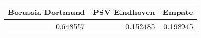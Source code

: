 \begin{tabular}{rrr}
\hline
   Borussia Dortmund &   PSV Eindhoven &   Empate \\
\hline
            0.648557 &        0.152485 & 0.198945 \\
\hline
\end{tabular}
